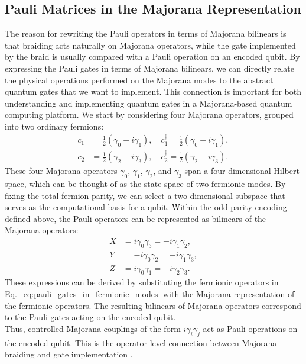 \subsection{Pauli Matrices in the Majorana Representation\newline}
The reason for rewriting the Pauli operators in terms of Majorana bilinears is that braiding acts naturally on Majorana operators, while the gate implemented by the braid is usually compared with a Pauli operation on an encoded qubit. By expressing the Pauli gates in terms of Majorana bilinears, we can directly relate the physical operations performed on the Majorana modes to the abstract quantum gates that we want to implement. This connection is important for both understanding and implementing quantum gates in a Majorana-based quantum computing platform. We start by considering four Majorana operators, grouped into two ordinary fermions:
\begin{equation}
\begin{aligned}
  c_1 &= \frac{1}{2}(\gamma_0 + i\gamma_1), \quad
  c_1^\dagger = \frac{1}{2}(\gamma_0 - i\gamma_1), \\
  c_2 &= \frac{1}{2}(\gamma_2 + i\gamma_3), \quad
  c_2^\dagger = \frac{1}{2}(\gamma_2 - i\gamma_3).
\end{aligned}
\label{eq:four_majoranas}
\end{equation}
These four Majorana operators $\gamma_0$, $\gamma_1$, $\gamma_2$, and $\gamma_3$ span a four-dimensional Hilbert space, which can be thought of as the state space of two fermionic modes. By fixing the total fermion parity, we can select a two-dimensional subspace that serves as the computational basis for a qubit. Within the odd-parity encoding defined above, the Pauli operators can be represented as bilinears of the Majorana operators:
\begin{align*}
  X &= i\gamma_0\gamma_3 = -i\gamma_1\gamma_2, \\
  Y &= -i\gamma_0\gamma_2 = -i\gamma_1\gamma_3, \\
  Z &= i\gamma_0\gamma_1 = -i\gamma_2\gamma_3.
\end{align*}
These expressions can be derived by substituting the fermionic operators in Eq.~\ref{eq:pauli_gates_in_fermionic_modes} with the Majorana representation of the fermionic operators. The resulting bilinears of Majorana operators correspond to the Pauli gates acting on the encoded qubit.\\
Thus, controlled Majorana couplings of the form \(i\gamma_i\gamma_j\) act as Pauli operations on the encoded qubit. This is the operator-level connection between Majorana braiding and gate implementation \cite{nayakNonAbelianAnyonsTopological2008,aliceaNewDirectionsPursuit2012,lahtinenShortIntroductionTopological2017}.

